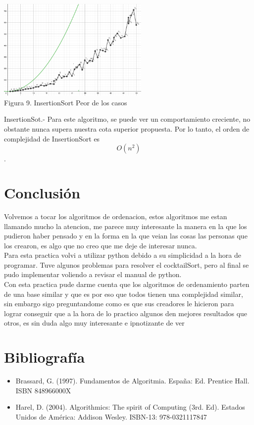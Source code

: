 \documentclass[spanish]{article}
\begin{document}
		\begin{center}
			\includegraphics[width=0.55\textwidth]{./imagenes/insertionPC.png}\\
			Figura 9. InsertionSort Peor de los casos\\
		\end{center}
InsertionSot.- Para este algoritmo, se puede ver un comportamiento creciente, no obstante nunca supera nuestra cota 	superior propuesta. Por lo tanto, el orden de complejidad de InsertionSort es $$O(n^2)$$.


	\bigskip

	
	\newpage

	\bigskip

	\section{Conclusi\'on}

	\bigskip

	Volvemos a tocar los algoritmos de ordenacion, estos algoritmos me estan llamando mucho la atencion, me parece muy interesante la manera en la que los pudieron haber pensado y en la forma en la que veian las cosas las personas que los crearon, es algo que no creo que me deje de interesar nunca.\\
Para esta practica volvi a utilizar python debido a su simplicidad a la hora de programar. Tuve algunos problemas para resolver el cocktailSort, pero al final se pudo implementar voliendo a revisar el manual de python.\\
Con esta practica pude darme cuenta que los algoritmos de ordenamiento parten de una base similar y que es por eso que todos tienen una complejidad similar, sin embargo sigo preguntandome como es que sus creadores le hicieron para lograr conseguir que a la hora de lo practico algunos den mejores resultados que otros, es sin duda algo muy interesante e ipnotizante de ver 

	\newpage

	\section{Bibliografía}
	\begin{itemize}
		\item Brassard, G. (1997). Fundamentos de Algoritmia. España: Ed. Prentice Hall. ISBN 848966000X
		\item Harel, D. (2004). Algorithmics: The spirit of Computing (3rd. Ed). Estados Unidos de América: Addison
Wesley. ISBN-13: 978-0321117847
	\end{itemize}
\end{document}
